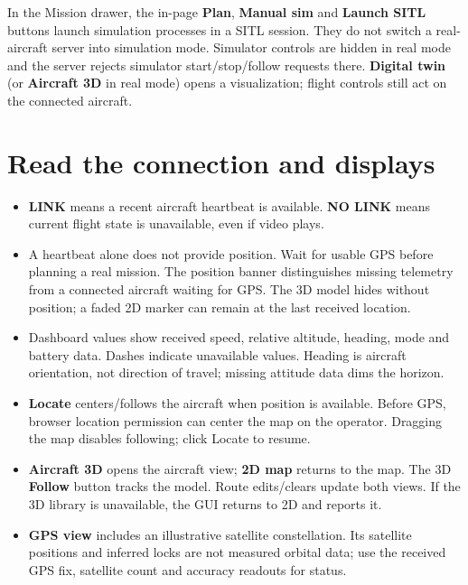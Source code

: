 \documentclass[11pt]{article}
\begin{document}
In the Mission drawer, the in-page \textbf{Plan}, \textbf{Manual sim} and \textbf{Launch SITL} buttons
launch simulation processes in a SITL session. They do not switch a real-aircraft
server into simulation mode. Simulator controls are hidden in real mode and the
server rejects simulator start/stop/follow requests there. \textbf{Digital twin}
(or \textbf{Aircraft 3D} in real mode) opens a visualization; flight controls still
act on the connected aircraft.

\section{Read the connection and displays}
\begin{itemize}[leftmargin=1.4em,itemsep=3pt]
  \item \textbf{LINK} means a recent aircraft heartbeat is available.
    \textbf{NO LINK} means current flight state is unavailable, even if video plays.
  \item A heartbeat alone does not provide position. Wait for usable GPS before
    planning a real mission. The position banner distinguishes missing telemetry
    from a connected aircraft waiting for GPS. The 3D model hides without position;
    a faded 2D marker can remain at the last received location.
  \item Dashboard values show received speed, relative altitude, heading, mode
    and battery data. Dashes indicate unavailable values. Heading is aircraft
    orientation, not direction of travel; missing attitude data dims the horizon.
  \item \textbf{Locate} centers/follows the aircraft when position is available.
    Before GPS, browser location permission can center the map on the operator.
    Dragging the map disables following; click Locate to resume.
  \item \textbf{Aircraft 3D} opens the aircraft view; \textbf{2D map} returns to the map.
    The 3D \textbf{Follow} button tracks the model. Route edits/clears update both
    views. If the 3D library is unavailable, the GUI returns to 2D and reports it.
  \item \textbf{GPS view} includes an illustrative satellite constellation.
    Its satellite positions and inferred locks are not measured orbital data;
    use the received GPS fix, satellite count and accuracy readouts for status.
\end{itemize}
\end{document}
